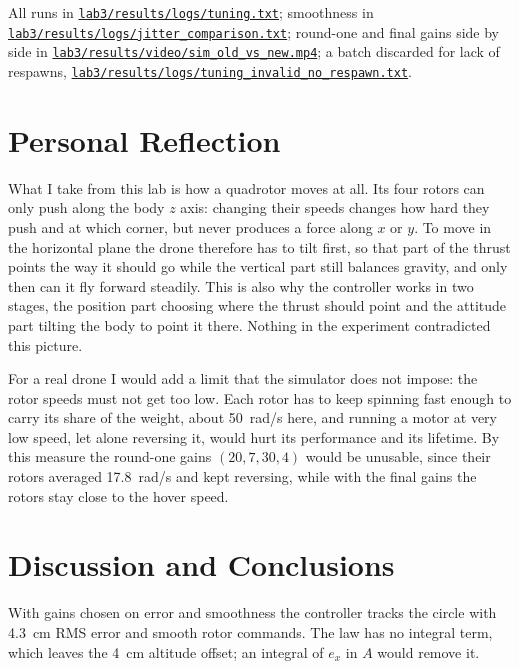 \documentclass[a4paper]{tufte-handout}
\newcommand{\repo}[1]{\href{https://github.com/Qzz139/LEARN-MIT16.485/blob/main/#1}{\nolinkurl{#1}}}
\begin{document}
\begin{evidence}
All runs in \repo{lab3/results/logs/tuning.txt}; smoothness in
\repo{lab3/results/logs/jitter_comparison.txt}; round-one and final gains side by
side in \repo{lab3/results/video/sim_old_vs_new.mp4}; a batch discarded for
lack of respawns, \repo{lab3/results/logs/tuning_invalid_no_respawn.txt}.
\end{evidence}

\section{Personal Reflection}\label{sec:reflection}
What I take from this lab is how a quadrotor moves at all. Its four rotors can
only push along the body $z$ axis: changing their speeds changes how hard they push
and at which corner, but never produces a force along $x$ or $y$. To move in the
horizontal plane the drone therefore has to tilt first, so that part of the thrust
points the way it should go while the vertical part still balances gravity, and
only then can it fly forward steadily. This is also why the controller works in two
stages, the position part choosing where the thrust should point and the attitude
part tilting the body to point it there. Nothing in the experiment contradicted
this picture.

For a real drone I would add a limit that the simulator does not impose: the rotor
speeds must not get too low. Each rotor has to keep spinning fast enough to carry
its share of the weight, about \SI{50}{rad/s} here, and running a motor at very low
speed, let alone reversing it, would hurt its performance and its lifetime. By this
measure the round-one gains $(20,7,30,4)$ would be unusable, since their rotors
averaged \SI{17.8}{rad/s} and kept reversing, while with the final gains the rotors
stay close to the hover speed.

\section{Discussion and Conclusions}\label{sec:conclusions}
With gains chosen on error and smoothness the controller tracks the circle with
\SI{4.3}{cm} RMS error and smooth rotor commands. The law has no integral term, which leaves
the \SI{4}{cm} altitude offset; an integral of $e_x$ in $A$ would remove it.

{\footnotesize}

\end{document}
